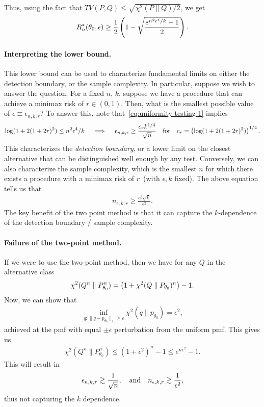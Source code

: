 \documentclass[12pt]{article}
\begin{document}
Thus, using the fact that $TV(P, Q) \leq \sqrt{\chi^2(P \parallel Q)/2}$, we get 
\begin{align}
R^*_n(\theta_0, \epsilon) \geq \frac{1}{2}\left( 1 - \sqrt{\frac{e^{n^2 \epsilon^4/k} -1 }{2}} \right). \label{eq:uniformity-testing-1}
\end{align}

\paragraph{Interpreting the lower bound.} This lower bound can be used to characterize fundamental limits on either the detection boundary, or the sample complexity. In particular, suppose we wish to answer the question: For a fixed $n$, $k$, suppose we have a procedure that can achieve a minimax risk of $r \in (0,1)$. Then, what is the smallest possible value of $\epsilon \equiv \epsilon_{n,k,r}$? To answer this, note that~\eqref{eq:uniformity-testing-1} implies 
\begin{align}
\log (1 + 2(1 + 2r)^2) \leq  {n^2 \epsilon^4/k}  \quad \implies \quad \epsilon_{n, k, r} \geq \frac{c_r k^{1/4}}{\sqrt{n}} \quad \text{for} \quad c_r = \left( \log (1 + 2(1 + 2r)^2)\right)^{1/4}. 
\end{align}
This characterizes the \emph{detection boundary}, or a lower limit on the closest alternative that can be distinguished well enough by any test. 
Conversely, we can also characterize the sample complexity,  which is the smallest $n$ for which there exists a procedure with a minimax risk of $r$~(with $\epsilon, k$ fixed). The above equation tells us that 
\begin{align}
n_{\epsilon,k, r} \geq \frac{c_r^2 \sqrt{k}}{\epsilon^2}. 
\end{align}
The key benefit of the two point method is that it can capture the $k$-dependence of the detection boundary / sample complexity. 

\paragraph{Failure of the two-point method.} If we were to use the two-point method, then we have for any $Q$ in the alternative class
\begin{align}
\chi^2(Q^n \parallel P_{\theta_0}^n) = \left( 1 + \chi^2(Q \parallel P_{\theta_0})^n \right) - 1. 
\end{align}
Now, we can show that 
\begin{align}
\inf_{q: \|q-p_{\theta_0}\|_1 \geq \epsilon} \chi^2 (q \parallel p_{\theta_0}) = \epsilon^2, 
\end{align}
achieved at the pmf with equal $\pm \epsilon$  perturbation from the uniform pmf. This gives us 
\begin{align}
\chi^2(Q^n \parallel P_{\theta_0}^n) \leq (1+ \epsilon^2)^n - 1 \leq e^{n \epsilon^2} - 1. 
\end{align}
This will result in 
\begin{align}
\epsilon_{n, k, r} \gtrsim \frac{1}{\sqrt{n}}, \quad \text{and} \quad n_{\epsilon, k, r} \gtrsim \frac{1}{\epsilon^2}, 
\end{align}
thus not capturing the $k$ dependence. 
\end{document}
